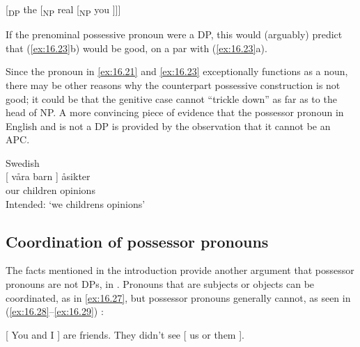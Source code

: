 \documentclass[output=paper]{langsci/langscibook}
\begin{document}
\ea\label{ex:16.24}
    {}[\textsubscript{DP} the [\textsubscript{NP} real [\textsubscript{NP} you ]]]
\z

If the prenominal possessive pronoun were a DP, this would (arguably) predict
that (\ref{ex:16.23}b) would be good, on a par with (\ref{ex:16.23}a).

Since the pronoun in \eqref{ex:16.21} and \eqref{ex:16.23}
exceptionally functions as a noun, there may be other reasons why the
counterpart possessive construction is not good; it could be that the
genitive case cannot \enquote{trickle down} as far as to the
head of NP. A more convincing piece of evidence that the possessor pronoun in
English and  is not a DP is provided by the observation that it cannot
be an APC.

\ea Swedish\\\label{ex:16.25}
    \gll \llap{*}{}[ våra barn ] åsikter\\
        {} our  children {} opinions\\
    \glt Intended: `we childrens opinions'
\z

\label{ex:16.26}
\z

\subsection{Coordination of possessor pronouns}\label{sec:16.3.2}

The   facts mentioned in the introduction provide another
argument that possessor pronouns are not DPs, in . Pronouns that are
subjects or objects can be coordinated, as in \eqref{ex:16.27}, but possessor pronouns
generally cannot, as seen in (\ref{ex:16.28}--\ref{ex:16.29}) \parencite[601--602]{QuirkEtAl1972}:

\ea\label{ex:16.27}
    {}[ You and I ] are friends. They didn’t see [ us or them ].
\z

\ea\label{ex:16.28}
    \begin{multicols}{2}
	\z\end{multicols}
\z

\ea\label{ex:16.29}
    \begin{multicols}{2}
	\z\end{multicols}
\z
\end{document}
